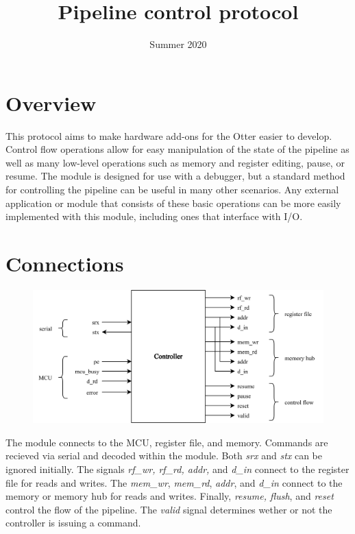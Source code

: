 \documentclass[10pt,a4paper]{article}
\title{Pipeline control protocol}
\date{Summer 2020}
\begin{document}
\maketitle

\section{Overview}

This protocol aims to make hardware add-ons for the Otter easier to develop. Control flow operations
allow for easy manipulation of the state of the pipeline as well as many low-level operations such
as memory and register editing, pause, or resume. The module is designed for use with a debugger,
but a standard method for controlling the pipeline can be useful in many other scenarios. Any
external application or module that consists of these basic operations can be more easily
implemented with this module, including ones that interface with I/O.

\section{Connections}

\begin{figure}[H]
	\includegraphics[width=\textwidth]{pipeline_db}
\end{figure}
\medskip

The module connects to the MCU, register file, and memory. Commands are recieved via serial and
decoded within the module. Both \emph{srx} and \emph{stx} can be ignored initially. The signals \emph{rf\_wr, rf\_rd, addr,} and
\emph{d\_in} connect to the register file for reads and writes. The \emph{mem\_wr}, \emph{mem\_rd},
\emph{addr}, and \emph{d\_in} connect to the memory or memory hub for reads and writes. Finally,
\emph{resume, flush}, and \emph{reset} control the flow of the pipeline. The \emph{valid} signal
determines wether or not the controller is issuing a command.
\end{document}
